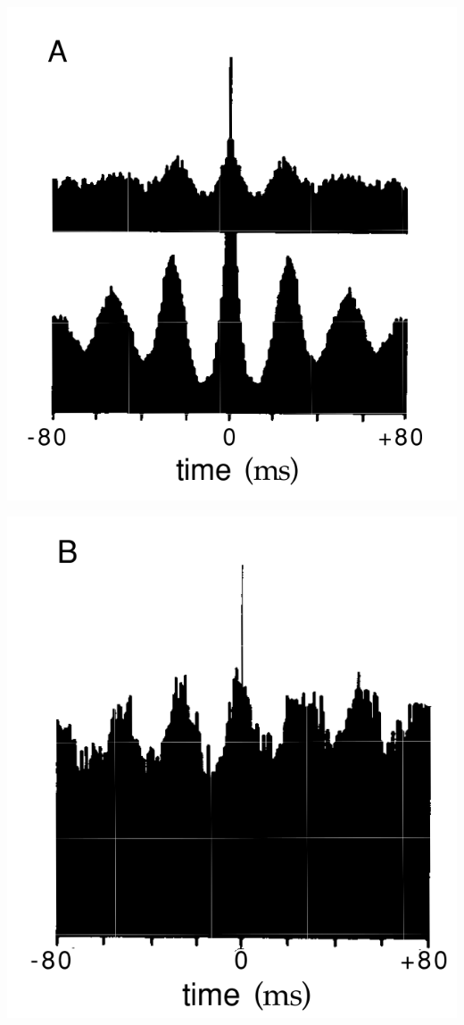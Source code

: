 \begin{center}
    \label{fig:1.12A}    
    \includegraphics[scale = 0.2]{png/Figure1-12-A.png}\\
\end{center}

\begin{center}
    \label{fig:1.12B}    
    \includegraphics[scale = 0.2]{png/Figure1-12-B.png}\\
\end{center}

